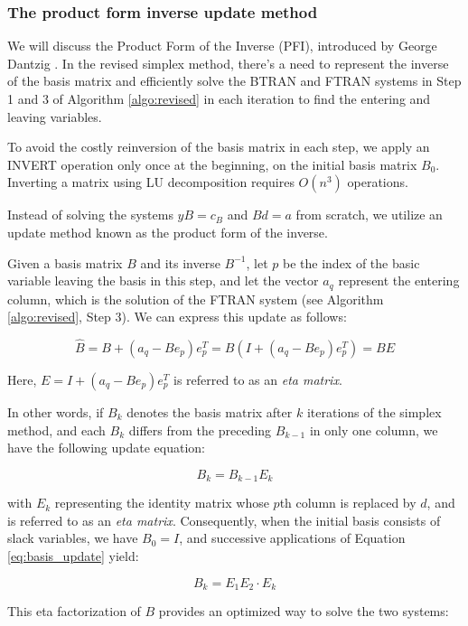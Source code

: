 \subsubsection{The product form inverse update method}

We will discuss the Product Form of the Inverse (PFI), introduced by
George Dantzig \parencite{dantzig1954product}. In the revised simplex method,
there's a need to represent the inverse of the basis matrix and efficiently
solve the BTRAN and FTRAN systems in Step 1 and 3 of Algorithm \ref{algo:revised}
in each iteration to find the entering and leaving variables.

To avoid the costly reinversion of the basis matrix in each step,
we apply an INVERT operation only once at the beginning, on the initial basis
matrix $B_0$. Inverting a matrix using LU decomposition requires $O(n^3)$
operations.

Instead of solving the systems $yB = c_B$ and $Bd = a$ from
scratch, we utilize an update method known as the product form of the inverse.

Given a basis matrix \(B\) and its inverse \(B^{-1}\),
let $p$ be the index of the basic variable leaving the basis in
this step, and let the vector \(a_q\) represent the entering column,
which is the solution of the FTRAN system (see Algorithm \ref{algo:revised},
Step 3). We can express this update as follows:

\[
    \hat{B} = B + (a_q - B e_p) e_p^T = B (I + (a_q - B e_p) e_p^T) = B E
\]

Here, \(E = I + (a_q - B e_p) e_p^T\) is referred to as an \textit{eta matrix}.

In other words, if \(B_k\) denotes the basis matrix after \(k\)
iterations of the simplex method, and each \(B_k\) differs from the
preceding \(B_{k-1}\) in only one column, we have the following update equation:

\[
    B_k = B_{k-1}E_k \label{eq:basis_update}
\]

with \(E_k\) representing the identity matrix whose \(p\)th column
is replaced by \(d\), and is referred to as an \textit{eta matrix}.
Consequently, when the initial basis consists of slack variables,
we have \(B_0 = I\), and successive applications of
Equation \ref{eq:basis_update} yield:

\[
    B_k = E_1E_2 \cdot E_k \label{eq:eta_factorization}
\]

This eta factorization of \(B\) provides an optimized way
to solve the two systems:

